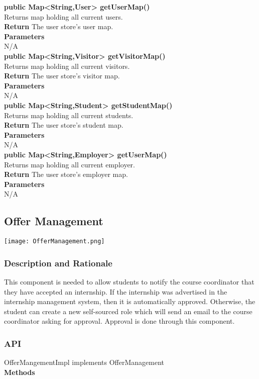 \documentclass{l3deliverable}
\begin{document}
\textbf{public Map<String,User> getUserMap()}\\
Returns map holding all current users.\\
\textbf{Return} The user store's user map.\\
\textbf{Parameters}\\
N/A
\\


\textbf{public Map<String,Visitor> getVisitorMap()}\\
Returns map holding all current visitors.\\
\textbf{Return} The user store's visitor map.\\
\textbf{Parameters}\\
N/A
\\

\textbf{public Map<String,Student> getStudentMap()}\\
Returns map holding all current students.\\
\textbf{Return} The user store's student map.\\
\textbf{Parameters}\\
N/A
\\

\textbf{public Map<String,Employer> getUserMap()}\\
Returns map holding all current employer.\\
\textbf{Return} The user store's employer map.\\
\textbf{Parameters}\\
N/A
\\
\subsection{Offer Management}
\texttt{[image: OfferManagement.png]}
\subsubsection{Description and Rationale}
This component is needed to allow students to notify the course coordinator that they have accepted an internship. If the internship was advertised in the internship management system, then it is automatically approved. Otherwise, the student can create a new self-sourced role which will send an email to the course coordinator asking for approval. Approval is done through this component.
\subsubsection{API}
OfferMangementImpl implements OfferManagement\\
\textbf{Methods}\\
\end{document}
